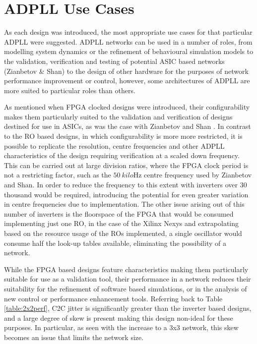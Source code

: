 \section*{\acs{ADPLL} Use Cases}
As each design was introduced, the most appropriate use cases for that particular \ac{ADPLL} were suggested. \ac{ADPLL} networks can be used in a number of roles, from modelling system dynamics or the refinement of behavioural simulation models to the validation, verification and testing of potential \ac{ASIC} based networks (Zianbetov \& Shan) to the design of other hardware for the purposes of network performance improvement or control, however, some architectures of \ac{ADPLL} are more suited to particular roles than others.

As mentioned when \ac{FPGA} clocked designs were introduced, their configurability makes them particularly suited to the validation and verification of designs destined for use in \acp{ASIC}, as was the case with Zianbetov and Shan \cite{zianbetov2013phd,shan2014phd}. In contrast to the \ac{RO} based designs, in which configurability is more more restricted, it is possible to replicate the resolution, centre frequencies and other \ac{ADPLL} characteristics of the design requiring verification at a scaled down frequency. This can be carried out at large division ratios, where the \ac{FPGA} clock period is not a restricting factor, such as the $50~\si{kilo\hertz}$ centre frequency used by Zianbetov and Shan. In order to reduce the frequency to this extent with inverters over $30$ thousand would be required, introducing the potential for even greater variation in centre frequencies due to implementation. The other issue arising out of this number of inverters is the floorspace of the \ac{FPGA} that would be consumed implementing just one \ac{RO}, in the case of the Xilinx \acl{Nexys} and extrapolating based on the resource usage of the \acp{RO} implemented, a single oscillator would consume half the look-up tables available, eliminating the possibility of a network.

While the \ac{FPGA} based designs feature characteristics making them particularly suitable for use as a validation tool, their performance in a network reduces their suitability for the refinement of software based simulations, or in the analysis of new control or performance enhancement tools. Referring back to Table \ref{table:2x2perf}, \ac{C2C} jitter is significantly greater than the inverter based designs, and a large degree of skew is present making this design non-ideal for these purposes. In particular, as seen with the increase to a 3x3 network, this skew becomes an issue that limits the network size.

